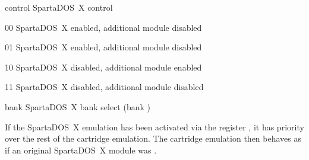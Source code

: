 \begin{fcmdlist}
\item[control] SpartaDOS~X control
  \begin{fvallistn}
  \item[00] SpartaDOS~X enabled, additional module disabled
  \item[01] SpartaDOS~X enabled, additional module disabled
  \item[10] SpartaDOS~X disabled, additional module enabled
  \item[11] SpartaDOS~X disabled, additional module disabled
  \end{fvallistn}
\item[bank] SpartaDOS~X bank select (bank )
\end{fcmdlist}

If the SpartaDOS~X emulation has been activated via the register , it
has priority over the rest of the cartridge emulation. The cartridge emulation then behaves
as if an original SpartaDOS~X module was .
